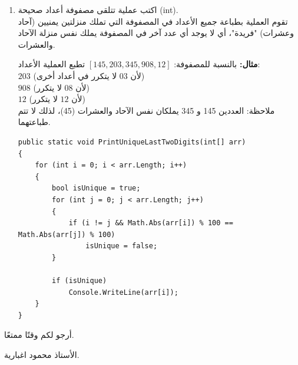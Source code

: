 \documentclass[14pt]{extarticle}
\begin{document}
\begin{enumerate}[itemsep=3em]
\ifwithsols
\begin{boxSolution}
\begin{english}
\begin{verbatim}
public static void PrintUniqueNames(string[] names)
{
    for (int i = 0; i < names.Length; i++)
    {
        bool isUnique = true;
        for (int j = 0; j < names.Length; j++)
        {
            if (i != j && names[i] == names[j])
                isUnique = false;
        }

        if (isUnique)
            Console.WriteLine(names[i]);
    }
}
\end{verbatim}
\end{english}
\end{boxSolution}
\fi

\clearpage
\item
اكتب عملية تتلقى مصفوفة أعداد صحيحة (\textenglish{int}). \\
تقوم العملية بطباعة جميع الأعداد في المصفوفة التي تملك منزلتين يمنيين (آحاد وعشرات) "فريدة"، أي لا يوجد أي عدد آخر في المصفوفة يملك نفس منزلة الآحاد والعشرات.

\textbf{مثال:}
بالنسبة للمصفوفة:
$ [145, 203, 345, 908, 12] $
تطبع العملية الأعداد: \\
$203$ (لأن $03$ لا يتكرر في أعداد أخرى) \\
$908$ (لأن $08$ لا يتكرر) \\
$12$ (لأن $12$ لا يتكرر) \\
ملاحظة: العددين 145 و 345 يملكان نفس الآحاد والعشرات (45)، لذلك لا تتم طباعتهما.

\ifwithsols
\begin{boxSolution}
\begin{english}
\begin{verbatim}
public static void PrintUniqueLastTwoDigits(int[] arr)
{
    for (int i = 0; i < arr.Length; i++)
    {
        bool isUnique = true;
        for (int j = 0; j < arr.Length; j++)
        {
            if (i != j && Math.Abs(arr[i]) % 100 == Math.Abs(arr[j]) % 100)
                isUnique = false;
        }

        if (isUnique)
            Console.WriteLine(arr[i]);
    }
}
\end{verbatim}
\end{english}
\end{boxSolution}
\fi

\end{enumerate}

\vspace{1cm}
\begin{flushleft}
أرجو لكم وقتًا ممتعًا.

الأستاذ محمود اغبارية.
\end{flushleft}
\end{document}
